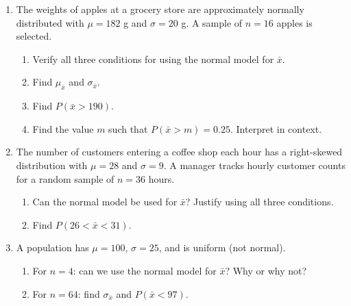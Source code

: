 \documentclass[10pt]{article}
\begin{document}
\namedateperiod

\vspace{0.15in}

\begin{enumerate}

  \item The weights of apples at a grocery store are approximately normally distributed
        with $\mu = 182$ g and $\sigma = 20$ g. A sample of $n = 16$ apples is selected.
        \begin{enumerate}[label=\alph*.]
          \item Verify all three conditions for using the normal model for $\bar{x}$.
          \item Find $\mu_{\bar{x}}$ and $\sigma_{\bar{x}}$.
                \vspace{0.6in}
          \item Find $P(\bar{x} > 190)$.
                \vspace{0.9in}
          \item Find the value $m$ such that $P(\bar{x} > m) = 0.25$. Interpret in context.
                \vspace{0.9in}
        \end{enumerate}

  \item The number of customers entering a coffee shop each hour has a right-skewed
        distribution with $\mu = 28$ and $\sigma = 9$. A manager tracks hourly customer
        counts for a random sample of $n = 36$ hours.
        \begin{enumerate}[label=\alph*.]
          \item Can the normal model be used for $\bar{x}$? Justify using all three conditions.
          \item Find $P(26 < \bar{x} < 31)$.
                \vspace{0.9in}
        \end{enumerate}

  \item A population has $\mu = 100$, $\sigma = 25$, and is uniform (not normal).
        \begin{enumerate}[label=\alph*.]
          \item For $n = 4$: can we use the normal model for $\bar{x}$? Why or why not?
          \item For $n = 64$: find $\sigma_{\bar{x}}$ and $P(\bar{x} < 97)$.
                \vspace{0.9in}
        \end{enumerate}

\end{enumerate}
\end{document}
